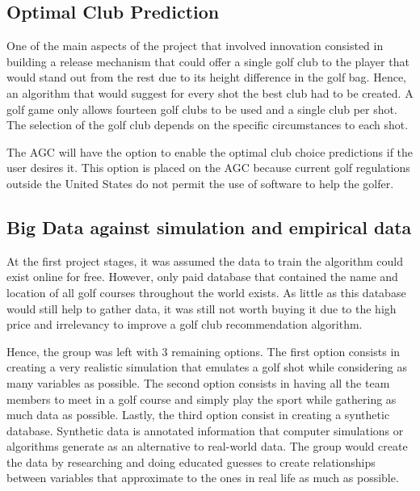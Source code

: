 \documentclass[11pt,landscape]{article}
\begin{document}
\begin{multicols}{3}

\section{Optimal Club Prediction}
One of the main aspects of the project that involved innovation consisted in
building a release mechanism that could offer a single golf club to the player
that would stand out from the rest due to its height difference in the golf bag.
Hence, an algorithm that would suggest for every shot the best club had to be
created. A golf game only allows fourteen golf clubs to be used and a single
club per shot. The selection of the golf club depends on the specific
circumstances to each shot.

The AGC will have the option to enable the optimal club choice predictions if
the user desires it. This option is placed on the AGC because current golf
regulations outside the United States do not permit the use of software to help
the golfer.

\subsection{Big Data against simulation and empirical data}
At the first project stages, it was assumed the data to train the algorithm
could exist online for free. However, only paid database that contained the name
and location of all golf courses throughout the world exists. As little as this
database would still help to gather data, it was still not worth buying it due
to the high price and irrelevancy to improve a golf club recommendation
algorithm.

Hence, the group was left with 3 remaining options. The first option consists in
creating a very realistic simulation that emulates a golf shot while considering
as many variables as possible. The second option consists in having all the team
members to meet in a golf course and simply play the sport while gathering as
much data as possible. Lastly, the third option consist in creating a synthetic
database. Synthetic data is annotated information that computer simulations or
algorithms generate as an alternative to real-world data. The group would create
the data by researching and doing educated guesses to create relationships
between variables that approximate to the ones in real life as much as possible.


\end{multicols}
\end{document}
